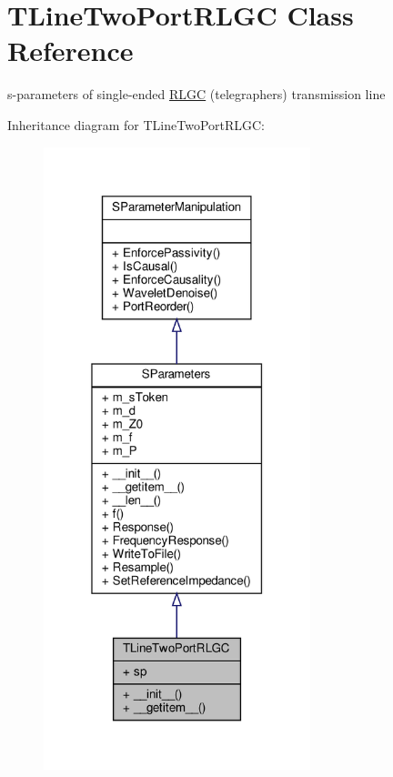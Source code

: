 \hypertarget{classSignalIntegrity_1_1SParameters_1_1Devices_1_1TLineTwoPortRLGC_1_1TLineTwoPortRLGC}{}\section{T\+Line\+Two\+Port\+R\+L\+GC Class Reference}
\label{classSignalIntegrity_1_1SParameters_1_1Devices_1_1TLineTwoPortRLGC_1_1TLineTwoPortRLGC}


s-\/parameters of single-\/ended \hyperlink{namespaceSignalIntegrity_1_1SParameters_1_1RLGC}{R\+L\+GC} (telegraphers) transmission line  




Inheritance diagram for T\+Line\+Two\+Port\+R\+L\+GC\+:
\nopagebreak
\begin{figure}[H]
\begin{center}
\leavevmode
\includegraphics[width=220pt]{classSignalIntegrity_1_1SParameters_1_1Devices_1_1TLineTwoPortRLGC_1_1TLineTwoPortRLGC__inherit__graph}
\end{center}
\end{figure}


